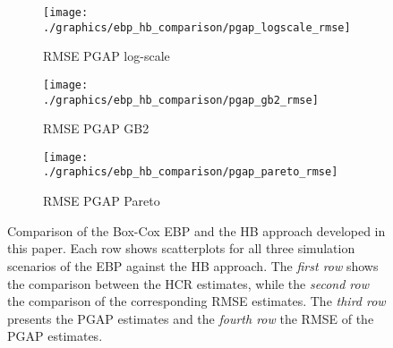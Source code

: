 \begin{figure}
    \begin{subfigure}{0.31\linewidth}
        \centering
        \texttt{[image: ./graphics/ebp\_hb\_comparison/pgap\_logscale\_rmse]}
        \caption{RMSE PGAP log-scale}
    \end{subfigure}
    \begin{subfigure}{0.31\linewidth}
        \centering
        \texttt{[image: ./graphics/ebp\_hb\_comparison/pgap\_gb2\_rmse]}
        \caption{RMSE PGAP GB2}
    \end{subfigure}
    \begin{subfigure}{0.31\linewidth}
        \centering
        \texttt{[image: ./graphics/ebp\_hb\_comparison/pgap\_pareto\_rmse]}
        \caption{RMSE PGAP Pareto}
    \end{subfigure}
    \caption[Comparison of EBP and HB approaches with simulated data.]{Comparison of the Box-Cox EBP and the HB approach developed in this paper. Each row shows scatterplots for all three simulation scenarios of the EBP against the HB approach. The \textit{first row} shows the comparison between the HCR estimates, while the \textit{second row} the comparison of the corresponding RMSE estimates. The \textit{third row} presents the PGAP estimates and the \textit{fourth row} the RMSE of the PGAP estimates.}
    \label{fig:ebp_hb_comparison}
\end{figure}

